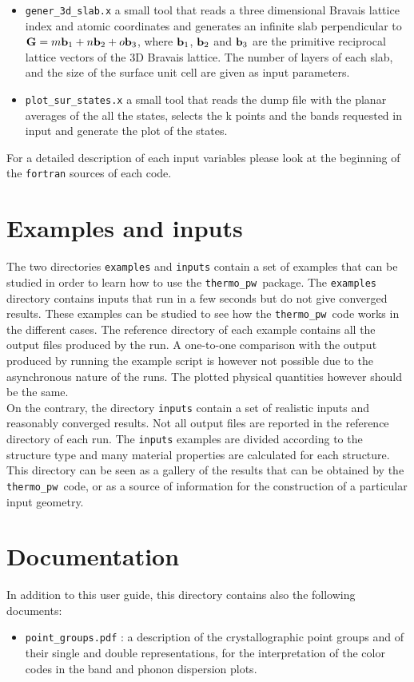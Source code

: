 \documentclass[12pt,a4paper]{article}
\def\thermo{\texttt{thermo\_pw}}
\begin{document}
\begin{itemize}
\item \texttt{gener\_3d\_slab.x} a small tool that reads a three dimensional
Bravais lattice index and atomic coordinates and generates an infinite slab
perpendicular to ${\bf G} = m {\bf b}_1 + n {\bf b}_2 + o {\bf b}_3$, where
${\bf b}_1$, ${\bf b}_2$ and ${\bf b}_3$ are the primitive reciprocal lattice
vectors of the 3D Bravais lattice. The number of layers of each slab, and the
size of the surface unit cell are given as input parameters.

\item \texttt{plot\_sur\_states.x} a small tool that reads the dump file
with the planar averages of the all the states, selects the k points
and the bands requested in input and generate the plot of the states.

\end{itemize}

For a detailed description of each input variables please look at the beginning 
of the \texttt{fortran} sources of each code.

\section{Examples and inputs}

The two directories \texttt{examples} and \texttt{inputs} contain a set
of examples that can be studied in order to learn how to use the \thermo\ 
package. The \texttt{examples} directory contains inputs that run in a few
seconds but do not give converged results. These examples can be studied 
to see how the \thermo\ code works in the different cases. The
reference directory of each example contains all the output
files produced by the run. A one-to-one comparison with the output
produced by running the example script is however not possible due to the
asynchronous nature of the runs. The plotted physical quantities however
should be the same. \\
On the contrary, the directory \texttt{inputs} contain a set
of realistic inputs and reasonably converged results. Not all
output files are reported in the reference directory of each run.
The \texttt{inputs} examples are divided according to the structure type
and many material properties are calculated for each structure.
This directory can be seen as a gallery of the results that can be
obtained by the \thermo\ code, or as a source of information for the
construction of a particular input geometry.

\section{Documentation}

In addition to this user guide, this directory contains also the following
documents:

\begin{itemize}

\item
\texttt{point\_groups.pdf} : a description of the crystallographic point groups
and of their single and double representations, for the interpretation of
the color codes in the band and phonon dispersion plots.


\end{itemize}
\end{document}

